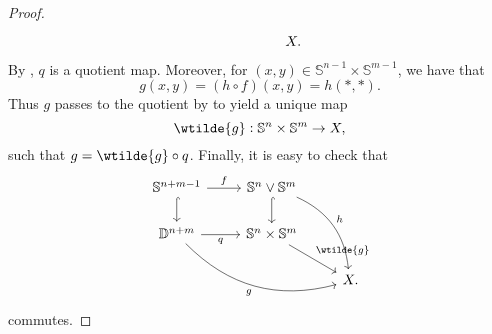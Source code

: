 \begin{proof}
\begin{equation*}
\begin{tikzcd}
			& & X.
		\end{tikzcd}
	\end{equation*}
	By \cite[186]{munkres:topology:2000}, $q$ is a quotient map. Moreover, for $(x,y) \in \mathbb{S}^{n - 1} \times \mathbb{S}^{m - 1}$, we have that
	\begin{equation*}
		g(x,y) = (h \circ f)(x,y) = h(\ast,\ast).
	\end{equation*}
	Thus $g$ passes to the quotient by \cite[72]{lee:topological_manifolds:2011} to yield a unique map
	\begin{equation*}
		\wtilde{g} : \mathbb{S}^n \times \mathbb{S}^m \to X,
	\end{equation*}
	\noindent such that $g = \wtilde{g} \circ q$. Finally, it is easy to check that
	\begin{equation*}
		\begin{tikzcd}
			\mathbb{S}^{n + m - 1} \arrow[r,"f"]\arrow[d,hook] & \mathbb{S}^n \vee \mathbb{S}^m \arrow[d,hook]\arrow[ddr,bend left,"h"]\\
			\mathbb{D}^{n + m} \arrow[r,"q"']\arrow[drr,bend right,"g"'] & \mathbb{S}^n \times \mathbb{S}^m\arrow[dr,"\wtilde{g}"]\\
			& & X.
		\end{tikzcd}
	\end{equation*}
	\noindent commutes.
\end{proof}

